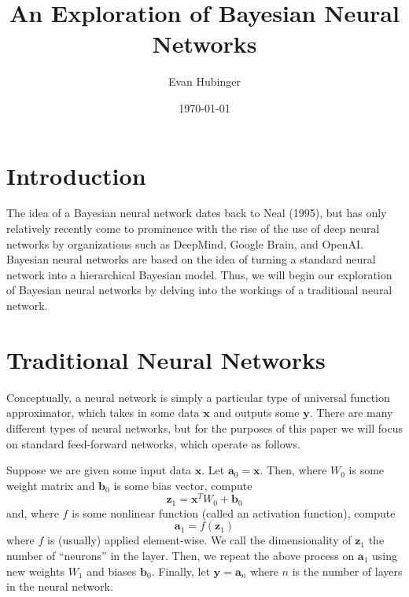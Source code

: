 \documentclass[
    preprint,
    12pt,
    letterpaper,
    longbibliography,
    nofootinbib,
    amsmath,
    amssymb,
    amsfonts,
]{revtex4-1}
\begin{document}
\title{An Exploration of Bayesian Neural Networks}
\author{Evan Hubinger}
\date{\today}

\maketitle




\section{Introduction}

The idea of a Bayesian neural network dates back to Neal (1995)\cite{neal}, but has only relatively recently come to prominence with the rise of the use of deep neural networks by organizations such as DeepMind, Google Brain, and OpenAI. Bayesian neural networks are based on the idea of turning a standard neural network into a hierarchical Bayesian model. Thus, we will begin our exploration of Bayesian neural networks by delving into the workings of a traditional neural network.

\section{Traditional Neural Networks}

Conceptually, a neural network is simply a particular type of universal function approximator, which takes in some data $\bm x$ and outputs some $\bm y$. There are many different types of neural networks, but for the purposes of this paper we will focus on standard feed-forward networks, which operate as follows.

Suppose we are given some input data $\bm x$. Let $\bm a_0 = \bm x$. Then, where $W_0$ is some weight matrix and $\bm b_0$ is some bias vector, compute
\[
    \bm z_1 = \bm x^T W_0 + \bm b_0
\]
and, where $f$ is some nonlinear function (called an activation function), compute
\[
    \bm a_1 = f(\bm z_1)
\]
where $f$ is (usually) applied element-wise. We call the dimensionality of $\bm z_1$ the number of ``neurons'' in the layer. Then, we repeat the above process on $\bm a_1$ using new weights $W_1$ and biases $\bm b_0$. Finally, let $\bm y = \bm a_n$ where $n$ is the number of layers in the neural network.
\end{document}

